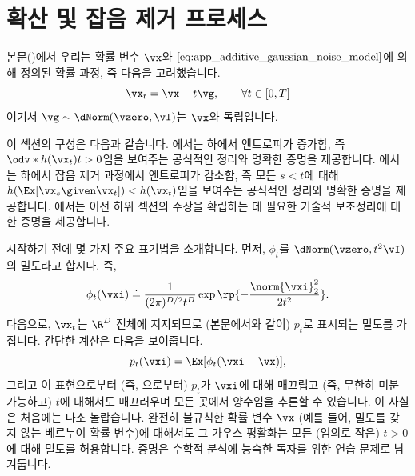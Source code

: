 \documentclass[../../book-main_ko.tex]{subfiles}
\begin{document}
\section{확산 및 잡음 제거 프로세스}\label{sec:entropy_diffusion}

본문()에서 우리는 확률 변수 \(\vx\)와 \(\eqref{eq:app_additive_gaussian_noise_model}\)에 의해 정의된 확률 과정, 즉 다음을 고려했습니다.
\begin{equation}\label{eq:app_additive_gaussian_noise_model}
    \vx_{t} = \vx + t\vg, \qquad  \forall t \in [0, T]
\end{equation}
여기서 \(\vg \sim \dNorm(\vzero, \vI)\)는 \(\vx\)와 독립입니다. 

이 섹션의 구성은 다음과 같습니다. 에서는  하에서 엔트로피가 증가함, 즉 \(\odv*{h(\vx_{t})}{t} > 0\)임을 보여주는 공식적인 정리와 명확한 증명을 제공합니다. 에서는  하에서 잡음 제거 과정에서 엔트로피가 감소함, 즉 모든 \(s < t\)에 대해 \(h(\Ex[\vx_{s} \given \vx_{t}]) < h(\vx_{t})\)임을 보여주는 공식적인 정리와 명확한 증명을 제공합니다. 에서는 이전 하위 섹션의 주장을 확립하는 데 필요한 기술적 보조정리에 대한 증명을 제공합니다.

시작하기 전에 몇 가지 주요 표기법을 소개합니다. 먼저, \(\phi_{t}\)를 \(\dNorm(\vzero, t^{2}\vI)\)의 밀도라고 합시다. 즉,
\begin{equation}\label{eq:gaussian_noise_time_t}
    \phi_{t}(\vxi) \doteq \frac{1}{(2\pi)^{D/2}t^{D}}\exp\rp{-\frac{\norm{\vxi}_{2}^{2}}{2t^{2}}}.
\end{equation}
다음으로, \(\vx_{t}\)는 \(\R^{D}\) 전체에 지지되므로 (본문에서와 같이) \(p_{t}\)로 표시되는 \( \textit{밀도}\)를 가집니다. 간단한 계산은 다음을 보여줍니다.
\begin{equation}\label{eq:p_t_representation}
    p_{t}(\vxi) = \Ex[\phi_{t}(\vxi - \vx)],
\end{equation}
그리고 이 표현으로부터 (즉, 으로부터) \(p_{t}\)가 \(\vxi\)에 대해 매끄럽고 (즉, 무한히 미분 가능하고) \(t\)에 대해서도 매끄러우며 모든 곳에서 양수임을 추론할 수 있습니다. 이 사실은 처음에는 다소 놀랍습니다. 완전히 불규칙한 확률 변수 \(\vx\) (예를 들어, 밀도를 갖지 않는 베르누이 확률 변수)에 대해서도 그 가우스 평활화는 모든 (임의로 작은) \(t > 0\)에 대해 밀도를 허용합니다. 증명은 수학적 분석에 능숙한 독자를 위한 연습 문제로 남겨둡니다.
\end{document}
